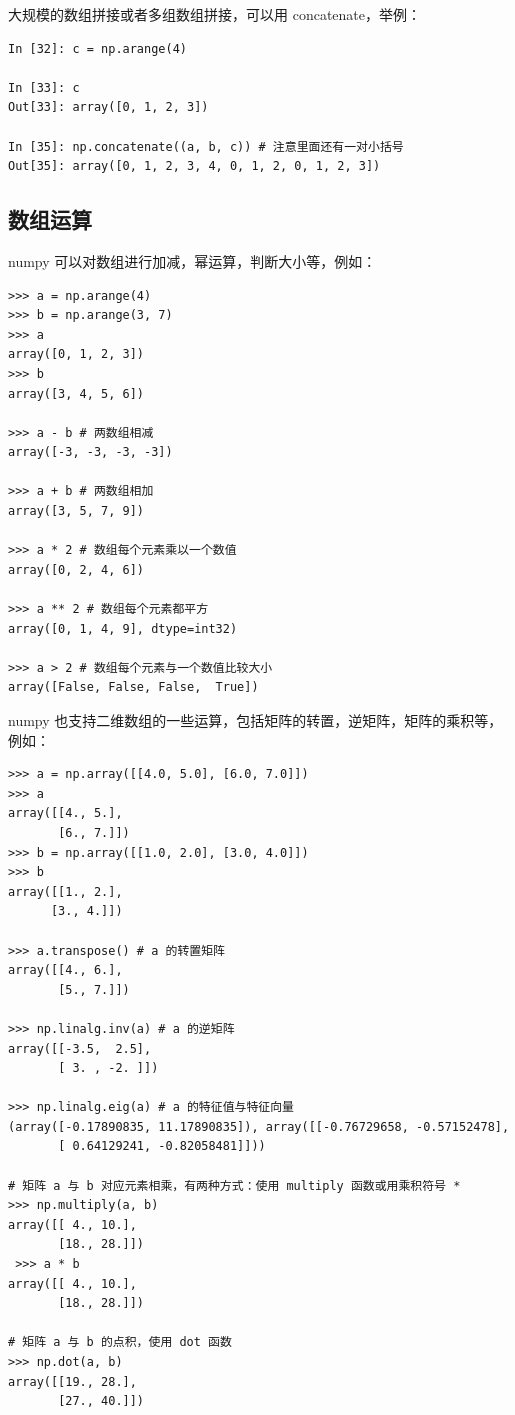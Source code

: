 大规模的数组拼接或者多组数组拼接，可以用 concatenate，举例：

\begin{lstlisting}[Language=Python]
In [32]: c = np.arange(4)

In [33]: c
Out[33]: array([0, 1, 2, 3])

In [35]: np.concatenate((a, b, c)) # 注意里面还有一对小括号
Out[35]: array([0, 1, 2, 3, 4, 0, 1, 2, 0, 1, 2, 3])
\end{lstlisting}



\subsection{数组运算}

numpy 可以对数组进行加减，幂运算，判断大小等，例如：

\begin{lstlisting}[Language=Python]
>>> a = np.arange(4)
>>> b = np.arange(3, 7)
>>> a
array([0, 1, 2, 3])
>>> b
array([3, 4, 5, 6])

>>> a - b # 两数组相减
array([-3, -3, -3, -3])

>>> a + b # 两数组相加
array([3, 5, 7, 9])

>>> a * 2 # 数组每个元素乘以一个数值
array([0, 2, 4, 6])

>>> a ** 2 # 数组每个元素都平方
array([0, 1, 4, 9], dtype=int32)

>>> a > 2 # 数组每个元素与一个数值比较大小
array([False, False, False,  True])

\end{lstlisting}

numpy 也支持二维数组的一些运算，包括矩阵的转置，逆矩阵，矩阵的乘积等，例如：

\begin{lstlisting}[Language=Python]
>>> a = np.array([[4.0, 5.0], [6.0, 7.0]])
>>> a
array([[4., 5.],
       [6., 7.]])
>>> b = np.array([[1.0, 2.0], [3.0, 4.0]])
>>> b
array([[1., 2.],
      [3., 4.]])

>>> a.transpose() # a 的转置矩阵
array([[4., 6.],
       [5., 7.]])

>>> np.linalg.inv(a) # a 的逆矩阵
array([[-3.5,  2.5],
       [ 3. , -2. ]])

>>> np.linalg.eig(a) # a 的特征值与特征向量
(array([-0.17890835, 11.17890835]), array([[-0.76729658, -0.57152478],
       [ 0.64129241, -0.82058481]]))

# 矩阵 a 与 b 对应元素相乘，有两种方式：使用 multiply 函数或用乘积符号 *
>>> np.multiply(a, b)
array([[ 4., 10.],
       [18., 28.]])
 >>> a * b
array([[ 4., 10.],
       [18., 28.]])

# 矩阵 a 与 b 的点积，使用 dot 函数
>>> np.dot(a, b)
array([[19., 28.],
       [27., 40.]])


\end{lstlisting}

